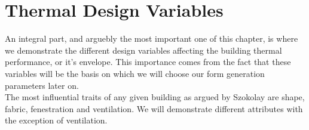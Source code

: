 \documentclass[a4paper,twoside,12pt,openright,final,oldfontcommands]{memoir}
\begin{document}
\section{Thermal Design Variables}
An integral part, and arguebly the most important one of this chapter, is where we demonstrate the
different design variables affecting the building thermal performance, or it's envelope. This
importance comes from the fact that these variables will be the basis on which we will choose our
form generation parameters later on.\\
The most influential traits of any given building as argued by Szokolay \cite{szokolay08} are shape,
fabric, fenestration and ventilation. We will demonstrate different attributes with the exception of
ventilation.\\ \vspace{0.5cm}
\end{document}
